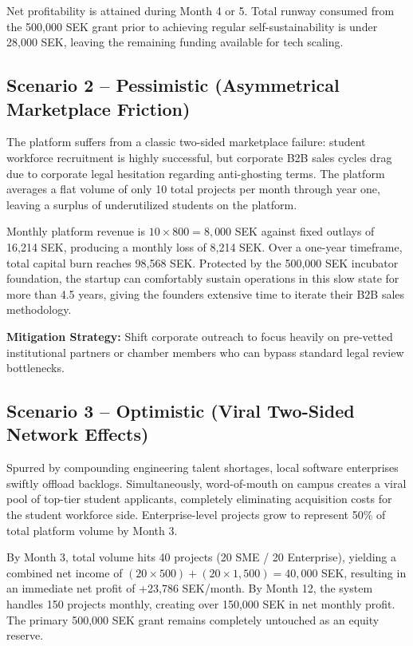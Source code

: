 \documentclass[12pt,a4paper]{article}
\begin{document}
Net profitability is attained during Month 4 or 5. Total runway consumed from the 500,000 SEK grant prior to achieving regular self-sustainability is under 28,000 SEK, leaving the remaining funding available for tech scaling.

\subsection{Scenario 2 -- Pessimistic (Asymmetrical Marketplace Friction)}

The platform suffers from a classic two-sided marketplace failure: student workforce recruitment is highly successful, but corporate B2B sales cycles drag due to corporate legal hesitation regarding anti-ghosting terms. The platform averages a flat volume of only 10 total projects per month through year one, leaving a surplus of underutilized students on the platform.

Monthly platform revenue is $10 \times 800 = 8,000$ SEK against fixed outlays of 16,214 SEK, producing a monthly loss of 8,214 SEK. Over a one-year timeframe, total capital burn reaches 98,568 SEK. Protected by the 500,000 SEK incubator foundation, the startup can comfortably sustain operations in this slow state for more than 4.5 years, giving the founders extensive time to iterate their B2B sales methodology.

\textbf{Mitigation Strategy:} Shift corporate outreach to focus heavily on pre-vetted institutional partners or chamber members who can bypass standard legal review bottlenecks.

\subsection{Scenario 3 -- Optimistic (Viral Two-Sided Network Effects)}

Spurred by compounding engineering talent shortages, local software enterprises swiftly offload backlogs. Simultaneously, word-of-mouth on campus creates a viral pool of top-tier student applicants, completely eliminating acquisition costs for the student workforce side. Enterprise-level projects grow to represent 50\% of total platform volume by Month 3.

By Month 3, total volume hits 40 projects (20 SME / 20 Enterprise), yielding a combined net income of $(20 \times 500) + (20 \times 1,500) = 40,000$ SEK, resulting in an immediate net profit of +23,786 SEK/month. By Month 12, the system handles 150 projects monthly, creating over 150,000 SEK in net monthly profit. The primary 500,000 SEK grant remains completely untouched as an equity reserve.
\end{document}
